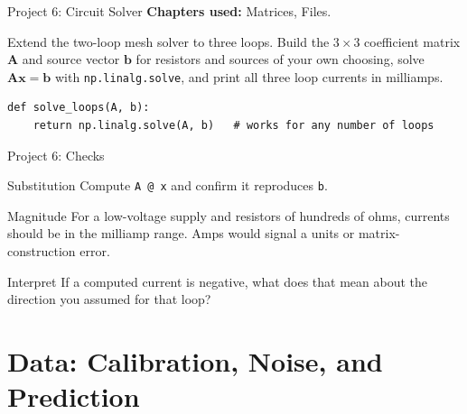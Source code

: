 \documentclass[9pt,aspectratio=169,xcolor=table]{beamer}
\begin{document}
\begin{frame}[fragile]{Project 6: Circuit Solver}
    \leavevmode
    \textbf{Chapters used:} Matrices, Files.

    \vspace{2mm}
    Extend the two-loop mesh solver to \alert{three loops}. Build the
    $3 \times 3$ coefficient matrix $\mathbf{A}$ and source vector
    $\mathbf{b}$ for resistors and sources of your own choosing, solve
    $\mathbf{A}\mathbf{x} = \mathbf{b}$ with \texttt{np.linalg.solve},
    and print all three loop currents in milliamps.

    \vspace{2mm}
\begin{lstlisting}
def solve_loops(A, b):
    return np.linalg.solve(A, b)   # works for any number of loops
\end{lstlisting}
\end{frame}

\begin{frame}{Project 6: Checks}
    \leavevmode
    \begin{block}{Substitution}
        Compute \texttt{A @ x} and confirm it reproduces \texttt{b}.
    \end{block}

    \vspace{2mm}
    \begin{block}{Magnitude}
        For a low-voltage supply and resistors of hundreds of ohms,
        currents should be in the milliamp range. Amps would signal a
        units or matrix-construction error.
    \end{block}

    \vspace{2mm}
    \begin{alertblock}{Interpret}
        If a computed current is negative, what does that mean about the
        direction you assumed for that loop?
    \end{alertblock}
\end{frame}

\section{Data: Calibration, Noise, and Prediction}
\end{document}
